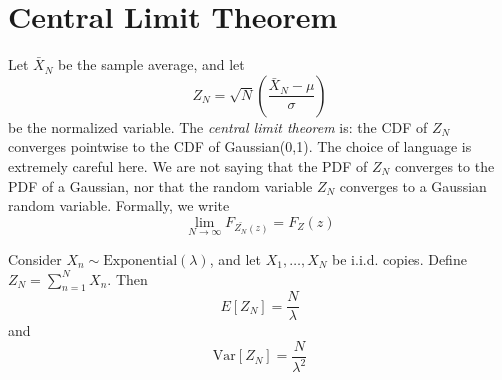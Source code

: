 \section{Central Limit Theorem}
Let $\bar{X}_N$ be the sample average,
and let
\begin{equation}
    Z_N = \sqrt{N} \left(\frac{\bar{X}_N-\mu}{\sigma}\right)
\end{equation}
be the normalized variable. The \emph{central limit theorem}
is: the CDF of $Z_N$ converges pointwise to the
CDF of Gaussian(0,1). The choice of language
is extremely careful here. We are not saying that the
PDF of $Z_N$ converges to the PDF of a Gaussian, nor that
the random variable $Z_N$ converges to a Gaussian random variable.
Formally, we write
\begin{equation}
    \lim_{N\rightarrow \infty} F_{\bar{Z_N}(z)} = F_Z(z)
\end{equation}

Consider $X_n \sim \text{Exponential}(\lambda)$, and let
$X_1, \dots, X_N$ be i.i.d. copies. Define
$Z_N = \sum_{n=1}^{N} X_n$. Then
\begin{equation}
    E[Z_N] = \frac{N}{\lambda}
\end{equation}
and
\begin{equation}
    \text{Var}[Z_N] = \frac{N}{\lambda^2}
\end{equation}

